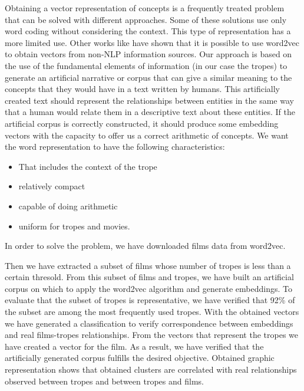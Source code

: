 \documentclass[letterpaper]{article}
\begin{document}
	
	Obtaining a vector representation of concepts is a frequently treated problem that can be solved with different approaches. Some of these solutions use only word coding without considering the context. This type of representation has a more limited use. Other works like \cite{kazama2018} have shown that it is
	possible to use word2vec to obtain vectors from non-NLP information
	sources. Our approach is based on the use of the fundamental elements
	of information (in our case the tropes) to generate an artificial
	narrative or corpus that can give a similar meaning to the concepts
	that they would have in a text written by humans. This artificially
	created text should represent the relationships between entities in
	the same way that a human would relate them in a descriptive text
	about these entities. If the artificial corpus is correctly
	constructed, it should produce some embedding vectors with the
	capacity to offer us a correct arithmetic of concepts. We want the word representation to have the following characteristics: 
	
	\begin{itemize}

	\item That includes the context of the trope
	\item relatively compact
	\item capable of doing arithmetic
	\item uniform for tropes and movies.
		
    \end{itemize}
	   
	   

    In order to solve the problem, we have downloaded films data from word2vec. %

    Then we have extracted a subset of films whose number of tropes is less than a certain thresold. From this subset of films and tropes, we have built an artificial corpus on which to apply the word2vec algorithm and generate embeddings. To evaluate that the subset of tropes is representative, we have verified that 92\% of the subset are among the most frequently used tropes. With the obtained vectors we have generated a classification to verify correspondence between embeddings and real films-tropes relationships. From the vectors that represent the tropes we have created a vector for the film. As a result, we have verified that the artificially generated corpus fulfills the desired objective. Obtained graphic representation shows that obtained clusters are correlated with real relationships observed between tropes and between tropes and films.\\
 
\end{document}
